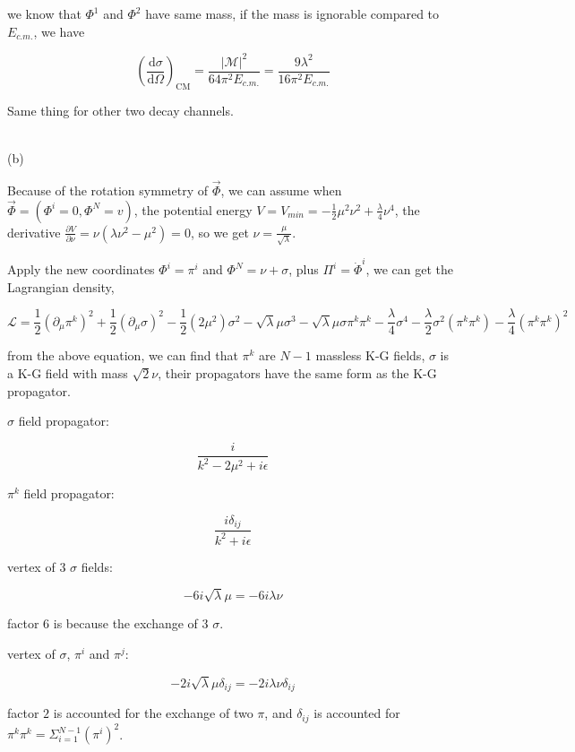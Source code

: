 \documentclass[11pt]{article} %
\begin{document}
we know that $\Phi^1$ and $\Phi^2$ have same mass, if the mass is ignorable compared to $E_{c.m.}$, we have

\[
    \left(\frac{\mathrm{d} \sigma}{\mathrm{d} \Omega}\right)_{\mathrm{CM}}=\frac{|\mathcal{M}|^{2}}{64 \pi^{2} E_{c.m.}} = \frac{9 \lambda^2}{16 \pi^2 E_{c.m.}}    
\]

Same thing for other two decay channels.

~\\
\noindent (b)

Because of the rotation symmetry of $\vec{\Phi}$, we can assume when $\vec{\Phi} = (\Phi^i = 0, \Phi^N = v)$, the potential energy $V = V_{min} = -\frac{1}{2} \mu^2 \nu^2 + \frac{\lambda}{4} \nu^4$, the derivative $\frac{\partial V}{\partial \nu} = \nu (\lambda \nu^2 - \mu^2) = 0$, so we get $\nu = \frac{\mu}{\sqrt{\lambda}}$.

Apply the new coordinates $\Phi^i = \pi^i$ and $\Phi^N = \nu + \sigma$, plus $\Pi^i = \dot{\Phi}^i $, we can get the Lagrangian density,

\[
    \mathcal{L}=\frac{1}{2}\left(\partial_{\mu} \pi^{k}\right)^{2}+\frac{1}{2}\left(\partial_{\mu} \sigma\right)^{2}-\frac{1}{2}\left(2 \mu^{2}\right) \sigma^{2}-\sqrt{\lambda} \mu \sigma^{3}-\sqrt{\lambda} \mu \sigma \pi^{k} \pi^{k} -\frac{\lambda}{4} \sigma^{4}-\frac{\lambda}{2} \sigma^{2}\left(\pi^{k} \pi^{k}\right)-\frac{\lambda}{4}\left(\pi^{k} \pi^{k}\right)^{2}
\]

from the above equation, we can find that $\pi^k$ are $N-1$ massless K-G fields, $\sigma$ is a K-G field with mass $\sqrt{2} \nu$, their propagators have the same form as the K-G propagator.

$\sigma$ field propagator:

\[
    \frac{i}{k^2 - 2\mu^2 +i \epsilon}
\]

$\pi^k$ field propagator:

\[
    \frac{i \delta_{ij}}{k^2 + i \epsilon}    
\]

vertex of $3$ $\sigma$ fields:

\[
    - 6 i \sqrt{\lambda} \mu = - 6 i \lambda \nu    
\]

factor $6$ is because the exchange of $3$ $\sigma$.

vertex of $\sigma$, $\pi^i$ and $\pi^j$:

\[
    - 2 i \sqrt{\lambda} \mu \delta_{ij} = - 2 i \lambda \nu \delta_{ij}
\]

factor $2$ is accounted for the exchange of two $\pi$, and $\delta_{ij}$ is accounted for $\pi^k \pi^k = \Sigma_{i = 1}^{N-1} (\pi^i)^2 $.
\end{document}
